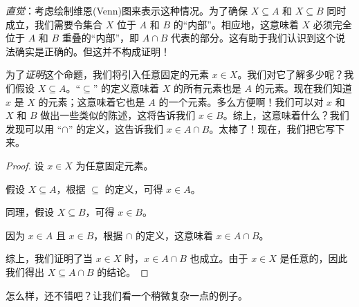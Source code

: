 \emph{直觉}：考虑绘制维恩(Venn)图来表示这种情况。为了确保 $X \subseteq A$ 和 $X \subseteq B$ 同时成立，我们需要令集合 $X$ 位于 $A$ 和 $B$ 的``内部''。相应地，这意味着 $X$ 必须完全位于 $A$ 和 $B$ 重叠的``内部''，即 $A \cap B$ 代表的部分。这有助于我们认识到这个说法确实是正确的。但这并不构成证明！
\begin{center}
\end{center}

为了\emph{证明}这个命题，我们将引入任意固定的元素 $x \in X$。我们对它了解多少呢？我们假设 $X \subseteq A$。``$\subseteq$'' 的定义意味着 $X$ 的所有元素也是 $A$ 的元素。现在我们知道 $x$ 是 $X$ 的元素；这意味着它也是 $A$ 的一个元素。多么方便啊！我们可以对 $x$ 和 $X$ 和 $B$ 做出一些类似的陈述，这将告诉我们 $x \in B$。综上，这意味着什么？我们发现可以用 ``$\cap$'' 的定义，这告诉我们 $x \in A \cap B$。太棒了！现在，我们把它写下来。

\begin{proof}
    设 $x \in X$ 为任意固定元素。

    假设 $X \subseteq A$，根据 $\subseteq$ 的定义，可得 $x \in A$。

    同理，假设 $X \subseteq B$，可得 $x \in B$。

    因为 $x \in A$ 且 $x \in B$，根据 $\cap$ 的定义，这意味着 $x \in A \cap B$。

    综上，我们证明了当 $x \in X$ 时，$x \in A \cap B$ 也成立。由于 $x \in X$ 是任意的，因此我们得出 $X \subseteq A \cap B$ 的结论。
\end{proof}

怎么样，还不错吧？让我们看一个稍微复杂一点的例子。

